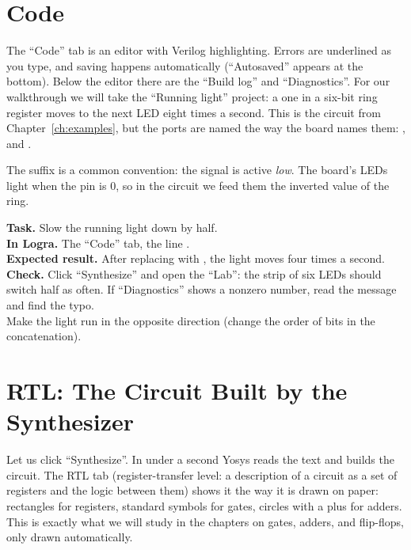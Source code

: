 \section{Code}

The ``Code'' tab is an editor with Verilog highlighting. Errors are underlined
as you type, and saving happens automatically (``Autosaved'' appears at the bottom).
Below the editor there are the ``Build log'' and ``Diagnostics''. For our walkthrough we will take the
``Running light'' project: a one in a six-bit ring register moves to the
next LED eight times a second. This is the circuit from Chapter~\ref{ch:examples},
but the ports are named the way the board names them: ,  and
.


\begin{infobox}
The suffix  is a common convention: the signal is active \emph{low}.
The board's LEDs light when the pin is 0, so in the circuit we
feed them the inverted value of the ring.
\end{infobox}

\begin{diybox}
\textbf{Task.} Slow the running light down by half.\\
\textbf{In Logra.} The ``Code'' tab, the line .\\
\textbf{Expected result.} After replacing  with , the light moves
four times a second.\\
\textbf{Check.} Click ``Synthesize'' and open the ``Lab'': the strip of
six LEDs should switch half as often. If ``Diagnostics'' shows a
nonzero number, read the message and find the typo.\\
 Make the light run in the opposite direction (change the
order of bits in the concatenation).
\end{diybox}

\section{RTL: The Circuit Built by the Synthesizer}

Let us click ``Synthesize''. In under a second Yosys reads the text and builds the
circuit. The RTL tab (register-transfer level: a
description of a circuit as a set of registers and the logic between them) shows it the way
it is drawn on paper: rectangles for registers, standard symbols for
gates, circles with a plus for adders. This is exactly what we will study in
the chapters on gates, adders, and flip-flops, only drawn automatically.

